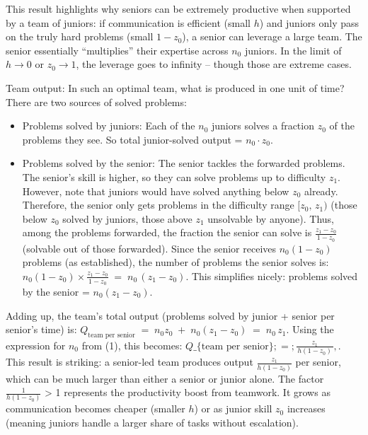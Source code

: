 \documentclass[12pt]{article}
\begin{document}
This result highlights why seniors can be extremely productive when
supported by a team of juniors: if communication is efficient (small
\(h\)) and juniors only pass on the truly hard problems (small
\(1-z_0\)), a senior can leverage a large team. {The senior
essentially ``multiplies'' their expertise across \(n_0\) juniors.} In
the limit of \(h \to 0\) or \(z_0 \to 1\), the leverage goes to infinity
-- though those are extreme cases.

{Team output:} In such an optimal team, what is produced in one
unit of time? There are two sources of solved problems:

\begin{itemize}

\item
  {Problems solved by juniors:} Each of the \(n_0\) juniors
  solves a fraction \(z_0\) of the problems they see. So total
  junior-solved output = \(n_0 \cdot z_0\).
\item
  {Problems solved by the senior:} The senior tackles the
  forwarded problems. The senior's skill is higher, so they can solve
  problems up to difficulty \(z_1\). However, note that juniors would
  have solved anything below \(z_0\) already. Therefore, the senior only
  {gets} problems in the difficulty range \([z_0,\, z_1)\) (those
  below \(z_0\) solved by juniors, those above
  $z_1$ unsolvable by anyone). Thus, among the problems forwarded, the fraction the senior can solve is \(\frac{z_1 - z_0}{\,1 - z_0\,}\)
  (solvable out of those forwarded). Since the senior receives
  \(n_0(1-z_0)\) problems (as established), the number of problems the
  senior solves is:
  \(n_0 (1-z_0) \times \frac{z_1 - z_0}{\,1 - z_0\,} \;=\; n_0\,(z_1 - z_0).\)
  This simplifies nicely: {problems solved by the senior =
  \(n_0 (z_1 - z_0)\).}
\end{itemize}

Adding up, the {team's total output} (problems solved by junior +
senior per senior's time) is:
\(Q_{\text{team per senior}} \;=\; n_0 z_0 \;+\; n_0 (z_1 - z_0) \;=\; n_0\, z_1.\)
Using the expression for \(n_0\) from (1), this becomes: $
Q\_\{\text{team per senior}\} ;=; \frac{z_1}{\,h(1 - z_0)\,},. \tag{2}$
This result is striking: a senior-led team produces output
\(\frac{z_1}{h(1-z_0)}\) per senior, which can be much larger than
either a senior or junior alone. The factor \(\frac{1}{h(1-z_0)}\)
\textgreater{} 1 represents the {productivity boost from
teamwork}. It grows as communication becomes cheaper (smaller \(h\)) or
as junior skill \(z_0\) increases (meaning juniors handle a larger share
of tasks without escalation).
\end{document}
